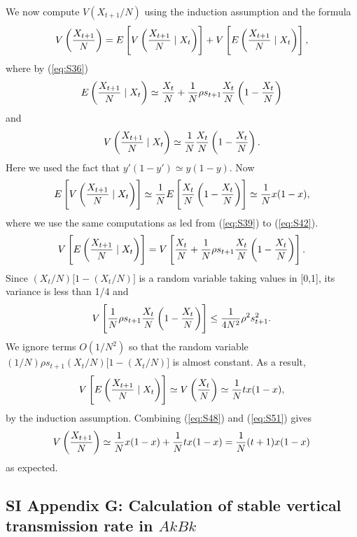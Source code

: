 \documentclass[9pt, a4paper]{extarticle}
\begin{document}
 We now compute $V(X_{t+1}/N)$ using the induction assumption and the formula
 \begin{equation}
 V\left({X_{t+1}\over N}\right) =E\left[V\left({X_{t+1}\over N}\mid X_t\right)\right] +V\left[E\left({X_{t+1}\over N}\mid X_t\right)\right],
 \end{equation}
 where by (\ref{eq:S36})
 \begin{equation}
 E\left({X_{t+1}\over N}\mid X_t\right)\simeq {X_t\over N} +{1\over N}\rho s_{t+1}{X_t\over N}\left(1-{X_t\over N}\right)
 \end{equation}
 and
 \begin{equation}
 V\left({X_{t+1}\over N}\mid X_t\right)\simeq{1\over N}{X_t\over N}\left(1-{X_t\over N}\right).
 \end{equation}
 Here we used the fact that  $y'(1-y')\simeq y(1-y)$. Now
 \begin{equation} \label{eq:S48}
 E\left[V\left({X_{t+1}\over N}\mid X_t\right)\right] \simeq {1\over N}E\left[{X_t\over N}\left(1-{X_t\over N}\right)\right]\simeq {1\over N}x(1-x),
 \end{equation}
 where we use the same computations as led from (\ref{eq:S39}) to (\ref{eq:S42}).
  \begin{equation}
  V\left[E\left({X_{t+1}\over N}\mid X_t\right)\right] =V\left[{X_t\over N} +{1\over N}\rho s_{t+1}{X_t\over N}\left(1-{X_t\over N}\right)\right].
  \end{equation}
 Since $(X_t/N)\bigl[1-(X_t/N)\bigr]$ is a random variable taking values in [0,1],  its variance is less than 1/4 and
 \begin{equation}
 V\left[{1\over N}\rho s_{t+1}{X_t\over N}\left(1-{X_t\over N}\right)\right] \le {1\over 4N^2}\rho^2 s_{t+1}^2.
 \end{equation}
 We ignore terms $O(1/N^2)$ so that the random variable $(1/N)\rho s_{t+1}(X_t/N)\bigl[1-(X_t/N)\bigr]$ is almost constant. As a result,
 \begin{equation} \label{eq:S51}
 V\left[E\left({X_{t+1}\over N}\mid X_t\right)\right]\simeq V\left({X_t\over N}\right) \simeq {1\over N}tx(1-x),
 \end{equation}
 by the induction assumption. Combining (\ref{eq:S48}) and (\ref{eq:S51}) gives
 \begin{equation}
 V\left({X_{t+1}\over N}\right)\simeq {1\over N}x(1-x) +{1\over N}tx(1-x) ={1\over N}(t+1)x(1-x)
 \end{equation}
 as expected.

\subsection*{SI Appendix G: Calculation of stable vertical transmission rate in $AkBk$}
\end{document}
